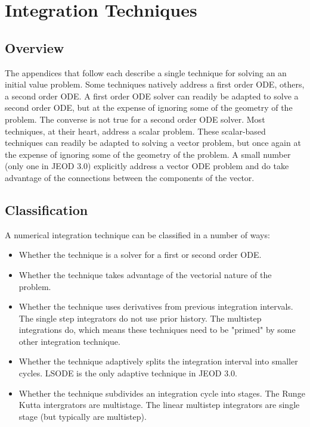 \chapter{Integration Techniques}\label{app:overview}

\section{Overview}

The appendices that follow each describe a single technique for solving an
an initial value problem.
Some techniques natively address a first order ODE, others, a second order ODE.
A first order ODE solver can readily be adapted to solve a second order ODE,
but at the expense of ignoring some of the geometry of the problem.
The converse is not true for a second order ODE solver.
Most techniques, at their heart, address a scalar problem. These scalar-based
techniques can readily be adapted to solving a vector problem, but once again
at the expense of ignoring some of the geometry of the problem.
A small number (only one in JEOD 3.0) explicitly address a vector ODE problem
and do take advantage of the connections between the components of the vector.

\section{Classification}

A numerical integration technique can be classified in a number of ways:
\begin{itemize}
\item Whether the technique is a solver for a first or second order ODE.
\item Whether the technique takes advantage of the vectorial nature of
the problem.
\item Whether the technique uses derivatives from previous integration
intervals. The single step integrators do not use prior history.
The multistep integrations do, which means these techniques need to be
"primed" by some other integration technique.
\item Whether the technique adaptively splits the integration interval
into smaller cycles. LSODE is the only adaptive technique in JEOD 3.0.
\item Whether the technique subdivides an integration cycle into stages.
The Runge Kutta intergrators are multistage. The linear multistep integrators
are single stage (but typically are multistep).
\end{itemize}

